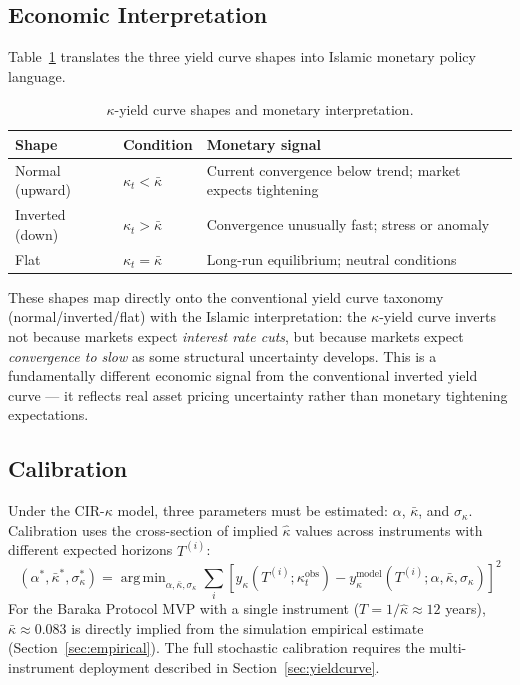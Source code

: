 \documentclass[10pt,twocolumn]{article}
\theoremstyle{plain}
\theoremstyle{definition}
\DeclareMathOperator*{\argmin}{arg\,min}
\begin{document}
\subsection{Economic Interpretation}

Table~\ref{tab:kappa_shapes} translates the three yield curve
shapes into Islamic monetary policy language.

\begin{table}[h!]
\centering
\caption{$\kappa$-yield curve shapes and monetary interpretation.}
\label{tab:kappa_shapes}
\small
\begin{tabular}{@{}p{2.2cm}p{2.4cm}p{2.4cm}@{}}
\toprule
\textbf{Shape} & \textbf{Condition} & \textbf{Monetary signal} \\
\midrule
Normal (upward) & $\kappa_t < \bar\kappa$ & Current convergence below trend; market expects tightening \\
Inverted (down) & $\kappa_t > \bar\kappa$ & Convergence unusually fast; stress or anomaly \\
Flat & $\kappa_t = \bar\kappa$ & Long-run equilibrium; neutral conditions \\
\bottomrule
\end{tabular}
\end{table}

These shapes map directly onto the conventional yield curve
taxonomy (normal/inverted/flat) with the Islamic interpretation:
the $\kappa$-yield curve inverts not because markets expect
\emph{interest rate cuts}, but because markets expect
\emph{convergence to slow} as some structural uncertainty
develops. This is a fundamentally different economic signal
from the conventional inverted yield curve --- it reflects
real asset pricing uncertainty rather than monetary tightening
expectations.

\subsection{Calibration}

Under the CIR-$\kappa$ model, three parameters must be estimated:
$\alpha$, $\bar\kappa$, and $\sigma_\kappa$. Calibration
uses the cross-section of implied $\hat\kappa$ values across
instruments with different expected horizons $T^{(i)}$:
\begin{equation}
(\alpha^*, \bar\kappa^*, \sigma_\kappa^*) =
\argmin_{\alpha,\bar\kappa,\sigma_\kappa}
\sum_i \left[y_\kappa(T^{(i)}; \kappa_t^{\text{obs}})
- y_\kappa^{\text{model}}(T^{(i)}; \alpha, \bar\kappa,
\sigma_\kappa)\right]^2
\label{eq:calibration}
\end{equation}
For the Baraka Protocol MVP with a single instrument ($T =
1/\hat\kappa \approx 12$ years), $\bar\kappa \approx 0.083$
is directly implied from the simulation empirical estimate
(Section~\ref{sec:empirical}). The full stochastic calibration
requires the multi-instrument deployment described in
Section~\ref{sec:yieldcurve}.
\end{document}
